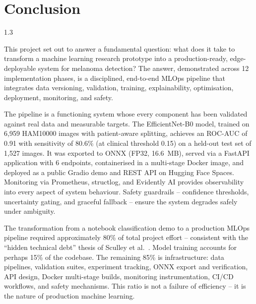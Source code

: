 
\chapter{Conclusion}
\begin{spacing}{1.3}

This project set out to answer a fundamental question: what does it take to transform a machine learning research prototype into a production-ready, edge-deployable system for melanoma detection? The answer, demonstrated across 12 implementation phases, is a disciplined, end-to-end MLOps pipeline that integrates data versioning, validation, training, explainability, optimisation, deployment, monitoring, and safety.

The pipeline is a functioning system whose every component has been validated against real data and measurable targets. The EfficientNet-B0 model, trained on 6,959 HAM10000 images with patient-aware splitting, achieves an ROC-AUC of 0.91 with sensitivity of 80.6\% (at clinical threshold 0.15) on a held-out test set of 1,527 images. It was exported to ONNX (FP32, 16.6~MB), served via a FastAPI application with 6 endpoints, containerised in a multi-stage Docker image, and deployed as a public Gradio demo and REST API on Hugging Face Spaces. Monitoring via Prometheus, structlog, and Evidently AI provides observability into every aspect of system behaviour. Safety guardrails -- confidence thresholds, uncertainty gating, and graceful fallback -- ensure the system degrades safely under ambiguity.

The transformation from a notebook classification demo to a production MLOps pipeline required approximately 80\% of total project effort -- consistent with the ``hidden technical debt'' thesis of Sculley et al.~\cite{sculley2015}. Model training accounts for perhaps 15\% of the codebase. The remaining 85\% is infrastructure: data pipelines, validation suites, experiment tracking, ONNX export and verification, API design, Docker multi-stage builds, monitoring instrumentation, CI/CD workflows, and safety mechanisms. This ratio is not a failure of efficiency -- it is the nature of production machine learning.


\end{spacing}

